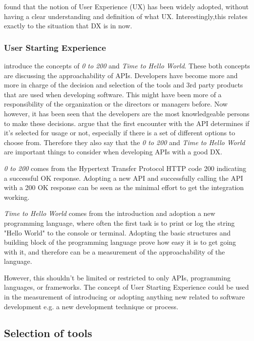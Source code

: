 \documentclass[english, 12pt, a4paper, sci, utf8, a-1b, online]{aaltothesis}
\begin{document}
\cite{understanding-ux} found that the notion of User Experience (UX) has been widely adopted, without having a clear understanding and definition of what UX. Interestingly,this relates exactly to the situation that DX is in now.

\subsubsection{User Starting Experience}

\cite{api-designers} introduce the concepts of \textit{0 to 200} and \textit{Time to Hello World}. These both concepts are discussing the approachability of APIs. Developers have become more and more in charge of the decision and selection of the tools and 3rd party products that are used when developing software. This might have been more of a responsibility of the organization or the directors or managers before. Now however, it has been seen that the developers are the most knowledgeable persons to make these decisions. \cite{api-designers} argue that the first encounter with the API determines if it's selected for usage or not, especially if there is a set of different options to choose from. Therefore they also say that the \textit{0 to 200} and \textit{Time to Hello World} are important things to consider when developing APIs with a good DX.

\textit{0 to 200} comes from the Hypertext Transfer Protocol HTTP code 200 indicating a successful OK response. Adopting a new API and successfully calling the API with a 200 OK response can be seen as the minimal effort to get the integration working.

\textit{Time to Hello World} comes from the introduction and adoption a new programming language, where often the first task is to print or log the string "Hello World" to the console or terminal. Adopting the basic structures and building block of the programming language prove how easy it is to get going with it, and therefore can be a measurement of the approachability of the language.

However, this shouldn't be limited or restricted to only APIs, programming languages, or frameworks. The concept of User Starting Experience could be used in the measurement of introducing or adopting anything new related to software development e.g. a new development technique or process.

\subsection{Selection of tools}
\end{document}
